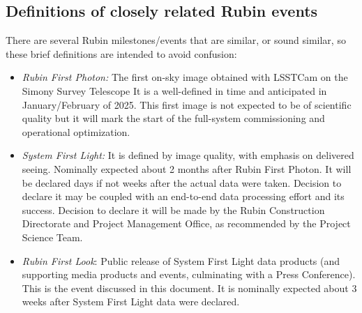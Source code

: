 \subsection{Definitions of closely related Rubin events}

There are several Rubin milestones/events that are similar, or sound similar, so these brief definitions
are intended to avoid confusion:
\begin{itemize}
\item {\it Rubin First Photon:} The first on-sky image obtained with LSSTCam on the Simony Survey Telescope
  It is a well-defined in time and anticipated in January/February of 2025. This first image is not expected to be
  of scientific quality but it will mark the start of the full-system commissioning and operational optimization.
\item {\it System First Light:} It is defined by image quality, with emphasis on delivered seeing.
Nominally expected about 2 months after Rubin First Photon. It will be declared days if not weeks after
the actual data were taken. Decision to declare it may be coupled with an end-to-end data processing effort
and its success. Decision to declare it will be made by the Rubin Construction Directorate and Project Management
Office, as recommended by the Project Science Team.  
\item {\it Rubin First Look}:  Public release of System First Light data products (and supporting media products
  and events, culminating with a  Press Conference). This is the event discussed in this document.
  It is nominally expected about 3 weeks after System First Light data were declared.
\end{itemize}
  



